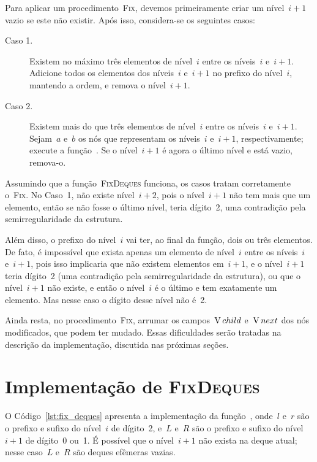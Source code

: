 \documentclass[main.tex]{subfiles}
\begin{document}
Para aplicar um procedimento~\textsc{Fix}, devemos primeiramente criar um nível~$i+1$ vazio se este não existir. Após isso, considera-se os seguintes casos:

\begin{description}
    \item[Caso 1.] Existem no máximo três elementos de nível~$i$ entre os níveis~$i$ e~$i+1$. \\ Adicione todos os elementos dos níveis~$i$ e~${i+1}$ no prefixo do nível~$i$, mantendo a ordem, e remova o nível~$i+1$.
    \item[Caso 2.] Existem mais do que três elementos de nível~$i$ entre os níveis~$i$ e~${i+1}$. \\ Sejam~$a$ e~$b$ os nós que representam os níveis~$i$ e~${i+1}$, respectivamente; execute a função~. Se o nível~$i+1$ é agora o último nível e está vazio, remova-o.
\end{description}

Assumindo que a função~\textsc{FixDeques} funciona, os casos tratam corretamente o~\textsc{Fix}. No Caso~1, não existe nível~${i+2}$, pois o nível~${i+1}$ não tem mais que um elemento, então se não fosse o último nível, teria dígito~2, uma contradição pela semirregularidade da estrutura.

Além disso, o prefixo do nível~$i$ vai ter, ao final da função, dois ou três elementos. De fato, é impossível que exista apenas um elemento de nível~$i$ entre os níveis~$i$ e~$i+1$, pois isso implicaria que não existem elementos em~$i+1$, e o nível~$i+1$ teria dígito~2 (uma contradição pela semirregularidade da estrutura), ou que o nível~${i+1}$ não existe, e então o nível~$i$ é o último e tem exatamente um elemento. Mas nesse caso o dígito desse nível não é~2.

Ainda resta, no procedimento~\textsc{Fix}, arrumar os campos~$\operatorname{V}{child}$ e~$\operatorname{V}{next}$ dos nós modificados, que podem ter mudado. Essas dificuldades serão tratadas na descrição da implementação, discutida nas próximas seções.

\section{Implementação de {\normalfont \textsc{FixDeques}}} \label{sec:fix_deques}

O Código~\ref{lst:fix_deques} apresenta a implementação da função~, onde~$l$ e~$r$ são o prefixo e sufixo do nível~$i$ de dígito~2, e~$L$ e~$R$ são o prefixo e sufixo do nível~$i+1$ de dígito~0 ou~1. É possível que o nível~$i+1$ não exista na deque atual; nesse caso~$L$ e~$R$ são deques efêmeras vazias.
\end{document}
